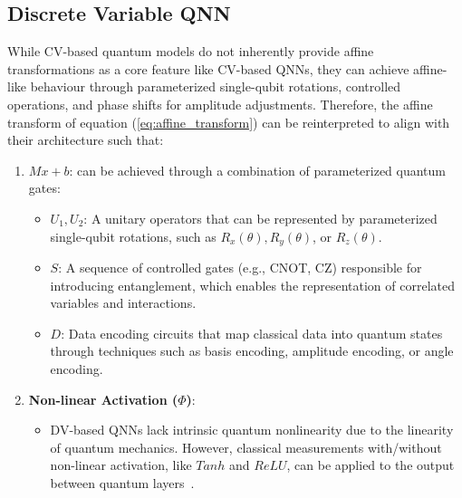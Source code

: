 \subsection{Discrete Variable QNN}

While CV-based quantum models do not inherently provide affine transformations as a core feature like CV-based QNNs, they can achieve affine-like behaviour through parameterized single-qubit rotations, controlled operations, and phase shifts for amplitude adjustments. Therefore, the affine transform of equation (\ref{eq:affine_transform}) can be reinterpreted to align with their architecture such that:

\begin{enumerate}
    \item \( Mx + b \): can be achieved through a combination of parameterized quantum gates:
    \begin{itemize}
        \item \( U_1, U_2 \): A unitary operators that can be represented by parameterized single-qubit rotations, such as \( R_x(\theta), R_y(\theta) \), or \( R_z(\theta) \).
        \item \( S \): A sequence of controlled gates (e.g., CNOT, CZ) responsible for introducing entanglement, which enables the representation of correlated variables and interactions.
        \item \( D \): Data encoding circuits that map classical data into quantum states through techniques such as basis encoding, amplitude encoding, or angle encoding.
    \end{itemize}

    \item \textbf{Non-linear Activation (\(\Phi\))}:
    \begin{itemize}
        \item DV-based QNNs lack intrinsic quantum nonlinearity due to the linearity of quantum mechanics. However, classical measurements with/without non-linear activation, like $Tanh$ and $ReLU$, can be applied to the output between quantum layers~\cite{tacchino2020quantum,mangini2021quantum}.
    \end{itemize}
\end{enumerate}








